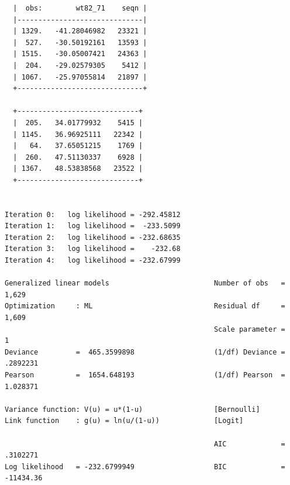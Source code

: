 \documentclass[
  10pt,
  a4paper,
]{book}
\begin{document}
\begin{verbatim}
  |  obs:        wt82_71    seqn |
  |------------------------------|
  | 1329.   -41.28046982   23321 |
  |  527.   -30.50192161   13593 |
  | 1515.   -30.05007421   24363 |
  |  204.   -29.02579305    5412 |
  | 1067.   -25.97055814   21897 |
  +------------------------------+

  +-----------------------------+
  |  205.   34.01779932    5415 |
  | 1145.   36.96925111   22342 |
  |   64.   37.65051215    1769 |
  |  260.   47.51130337    6928 |
  | 1367.   48.53838568   23522 |
  +-----------------------------+


Iteration 0:   log likelihood = -292.45812  
Iteration 1:   log likelihood =  -233.5099  
Iteration 2:   log likelihood = -232.68635  
Iteration 3:   log likelihood =    -232.68  
Iteration 4:   log likelihood = -232.67999  

Generalized linear models                         Number of obs   =      1,629
Optimization     : ML                             Residual df     =      1,609
                                                  Scale parameter =          1
Deviance         =  465.3599898                   (1/df) Deviance =   .2892231
Pearson          =  1654.648193                   (1/df) Pearson  =   1.028371

Variance function: V(u) = u*(1-u)                 [Bernoulli]
Link function    : g(u) = ln(u/(1-u))             [Logit]

                                                  AIC             =   .3102271
Log likelihood   = -232.6799949                   BIC             =  -11434.36


\end{verbatim}
\end{document}
